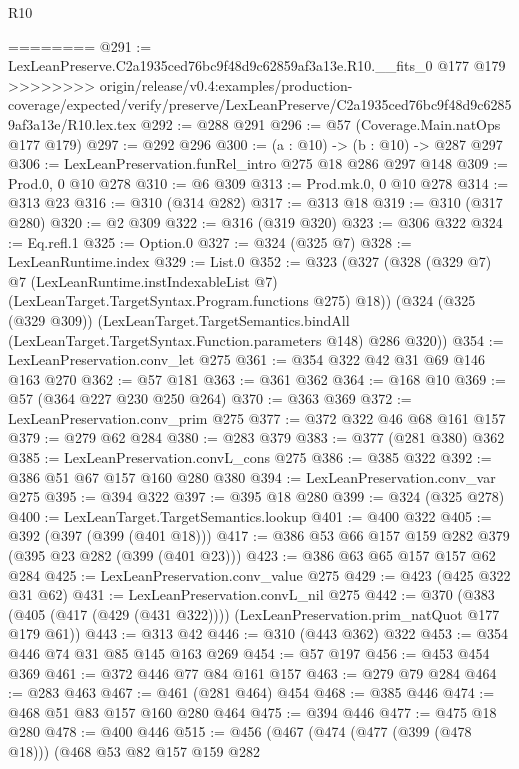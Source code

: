 \begin{lexlean}{R10}
\begin{coremodule}
{{{{{========
@291 := LexLeanPreserve.C2a1935ced76bc9f48d9c62859af3a13e.R10.__fits_0 @177 @179
>>>>>>>> origin/release/v0.4:examples/production-coverage/expected/verify/preserve/LexLeanPreserve/C2a1935ced76bc9f48d9c62859af3a13e/R10.lex.tex
@292 := @288 @291
@296 := @57 (Coverage.Main.natOps @177 @179)
@297 := @292 @296
@300 := (a : @10) -> (b : @10) -> @287 @297
@306 := LexLeanPreservation.funRel_intro @275 @18 @286 @297 @148
@309 := Prod.{0, 0} @10 @278
@310 := @6 @309
@313 := Prod.mk.{0, 0} @10 @278
@314 := @313 @23
@316 := @310 (@314 @282)
@317 := @313 @18
@319 := @310 (@317 @280)
@320 := @2 @309
@322 := @316 (@319 @320)
@323 := @306 @322
@324 := Eq.refl.{1}
@325 := Option.{0}
@327 := @324 (@325 @7)
@328 := LexLeanRuntime.index
@329 := List.{0}
@352 := @323
    (@327
      (@328
        (@329 @7)
        @7
        (LexLeanRuntime.instIndexableList @7)
        (LexLeanTarget.TargetSyntax.Program.functions @275)
        @18))
    (@324
      (@325 (@329 @309))
      (LexLeanTarget.TargetSemantics.bindAll
        (LexLeanTarget.TargetSyntax.Function.parameters @148)
        @286
        @320))
@354 := LexLeanPreservation.conv_let @275
@361 := @354 @322 @42 @31 @69 @146 @163 @270
@362 := @57 @181
@363 := @361 @362
@364 := @168 @10
@369 := @57 (@364 @227 @230 @250 @264)
@370 := @363 @369
@372 := LexLeanPreservation.conv_prim @275
@377 := @372 @322 @46 @68 @161 @157
@379 := @279 @62 @284
@380 := @283 @379
@383 := @377 (@281 @380) @362
@385 := LexLeanPreservation.convL_cons @275
@386 := @385 @322
@392 := @386 @51 @67 @157 @160 @280 @380
@394 := LexLeanPreservation.conv_var @275
@395 := @394 @322
@397 := @395 @18 @280
@399 := @324 (@325 @278)
@400 := LexLeanTarget.TargetSemantics.lookup
@401 := @400 @322
@405 := @392 (@397 (@399 (@401 @18)))
@417 := @386 @53 @66 @157 @159 @282 @379 (@395 @23 @282 (@399 (@401 @23)))
@423 := @386 @63 @65 @157 @157 @62 @284
@425 := LexLeanPreservation.conv_value @275
@429 := @423 (@425 @322 @31 @62)
@431 := LexLeanPreservation.convL_nil @275
@442 := @370
    (@383 (@405 (@417 (@429 (@431 @322)))) (LexLeanPreservation.prim_natQuot @177 @179 @61))
@443 := @313 @42
@446 := @310 (@443 @362) @322
@453 := @354 @446 @74 @31 @85 @145 @163 @269
@454 := @57 @197
@456 := @453 @454 @369
@461 := @372 @446 @77 @84 @161 @157
@463 := @279 @79 @284
@464 := @283 @463
@467 := @461 (@281 @464) @454
@468 := @385 @446
@474 := @468 @51 @83 @157 @160 @280 @464
@475 := @394 @446
@477 := @475 @18 @280
@478 := @400 @446
@515 := @456
    (@467
      (@474
        (@477 (@399 (@478 @18)))
        (@468
          @53
          @82
          @157
          @159
          @282
}}}}}
\end{coremodule}
\end{lexlean}
